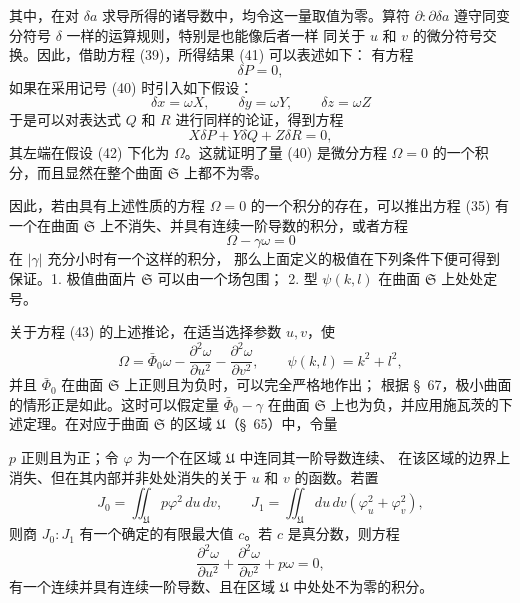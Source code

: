 \documentclass[11pt,a4paper,leqno]{article}
\begin{document}
其中，在对 $\delta a$ 求导所得的诸导数中，均令这一量取值为零。算符
$\partial:\partial\delta a$ 遵守同变分符号 $\delta$ 一样的运算规则，特别是也能像后者一样
同关于 $u$ 和 $v$ 的微分符号交换。因此，借助方程 (39)，所得结果 (41) 可以表述如下：
有方程
\[
\delta P=0,
\]
如果在采用记号 (40) 时引入如下假设：
\begin{equation}\tag{42}
\delta x=\omega X,\qquad \delta y=\omega Y,\qquad \delta z=\omega Z
\end{equation}
于是可以对表达式 $Q$ 和 $R$ 进行同样的论证，得到方程
\[
X\delta P+Y\delta Q+Z\delta R=0,
\]
其左端在假设 (42) 下化为 $\Omega$。这就证明了量 (40) 是微分方程
$\Omega=0$ 的一个积分，而且显然在整个曲面 $\mathfrak{S}$ 上都不为零。

因此，若由具有上述性质的方程 $\Omega=0$ 的一个积分的存在，可以推出方程 (35)
有一个在曲面 $\mathfrak{S}$ 上不消失、并具有连续一阶导数的积分，或者方程
\begin{equation}\tag{43}
\Omega-\gamma\omega=0
\end{equation}
在 $|\gamma|$ 充分小时有一个这样的积分，
那么上面定义的极值在下列条件下便可得到保证。1. 极值曲面片 $\mathfrak{S}$ 可以由一个场包围；
2. 型 $\psi(k,l)$ 在曲面 $\mathfrak{S}$ 上处处定号。

关于方程 (43) 的上述推论，在适当选择参数 $u,v$，使
\[
\Omega=\bar\Phi_0\omega-\frac{\partial^2\omega}{\partial u^2}
-\frac{\partial^2\omega}{\partial v^2},\qquad
\psi(k,l)=k^2+l^2,
\]
并且 $\bar\Phi_0$ 在曲面 $\mathfrak{S}$ 上正则且为负时，可以完全严格地作出；
根据 \S~67，极小曲面的情形正是如此。这时可以假定量 $\bar\Phi_0-\gamma$ 在曲面
$\mathfrak{S}$ 上也为负，并应用施瓦茨的下述定理。在对应于曲面 $\mathfrak{S}$ 的区域
$\mathfrak{U}$（\S~65）中，令量

$p$ 正则且为正；令 $\varphi$ 为一个在区域 $\mathfrak{U}$ 中连同其一阶导数连续、
在该区域的边界上消失、但在其内部并非处处消失的关于 $u$ 和 $v$ 的函数。若置
\[
J_0=\iint_{\mathfrak{U}}p\varphi^2\,du\,dv,\qquad
J_1=\iint_{\mathfrak{U}}du\,dv(\varphi_u^2+\varphi_v^2),
\]
则商 $J_0:J_1$ 有一个确定的有限最大值 $c$。若 $c$ 是真分数，则方程
\[
\frac{\partial^2\omega}{\partial u^2}
+\frac{\partial^2\omega}{\partial v^2}+p\omega=0,
\]
有一个连续并具有连续一阶导数、且在区域 $\mathfrak{U}$ 中处处不为零的积分。
\end{document}
